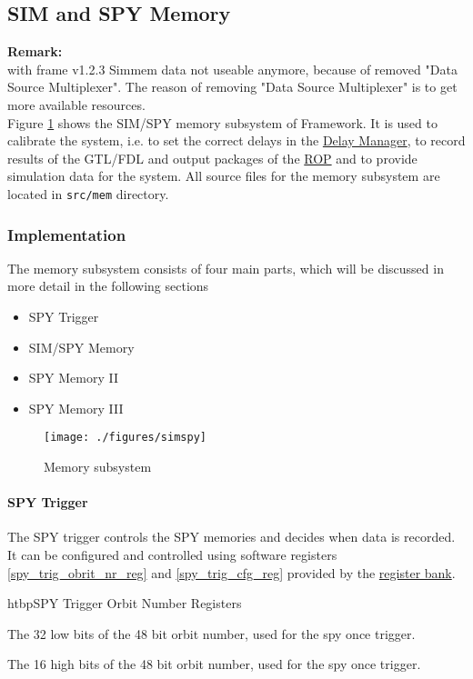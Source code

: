 \subsection{SIM and SPY Memory}\label{sec:frame:sim-spy}
\textbf{Remark:}\\
with frame v1.2.3 Simmem data not useable anymore, because of removed "Data Source Multiplexer".
The reason of removing "Data Source Multiplexer" is to get more available resources.\\

Figure \ref{fig_simspy} shows the SIM/SPY memory subsystem of Framework.
It is used to calibrate the system, i.e. to set the correct delays in the \hyperref[sec_dm]{Delay Manager}, to record results of the GTL/FDL and
output packages of the \hyperref[sec_rop]{ROP} and to provide simulation data for the system.
All source files for the memory subsystem are located in \texttt{src/mem} directory.

\subsubsection{Implementation}\label{sec:frame:sim_spy_impl}
The memory subsystem consists of four main parts, which will be discussed in more detail in the following sections

\begin{itemize}
\item SPY Trigger
\item SIM/SPY Memory
\item SPY Memory II
\item SPY Memory III
\end{itemize}

\begin{figure}[h]
\texttt{[image: ./figures/simspy]}
\caption{Memory subsystem}
\label{fig_simspy}
\end{figure}

\paragraph{SPY Trigger}\label{sec:frame:spy_trigger}
The SPY trigger controls the SPY memories and decides when data is recorded. It can be configured and controlled using
software registers \ref{spy_trig_obrit_nr_reg} and \ref{spy_trig_cfg_reg} provided by the \hyperref[sec_rb]{register bank}.

\begin{register}{htbp}{SPY Trigger Orbit Number Registers}{}%
	\label{spy_trig_obrit_nr_reg}
	\begin{regdesc}
	\begin{reglist}
		\item [orbit\_nr\_low] The 32 low bits of the 48 bit orbit number, used for the spy once trigger.
		\item [orbit\_nr\_high] The 16 high bits of the 48 bit orbit number, used for the spy once trigger.
	\end{reglist}
	\end{regdesc}
\end{register}

